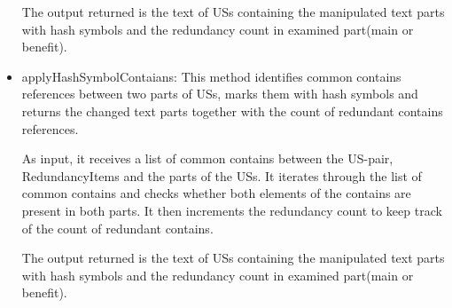\begin{itemize}
	The output returned is the text of USs containing the manipulated text parts with hash symbols and the redundancy count in examined part(main or benefit).
	
	\item applyHashSymbolContaians: This method identifies common contains references between two parts of USs, marks them with hash symbols and returns the changed text parts together with the count of redundant contains references. 
	
	As input, it receives a list of common contains between the US-pair, RedundancyItems and the parts of the USs. It iterates through the list of common contains and checks whether both elements of the contains are present in both parts. It then increments the redundancy count to keep track of the count of redundant contains.
	
	The output returned is the text of USs containing the manipulated text parts with hash symbols and the redundancy count in examined part(main or benefit).
	
\end{itemize}
